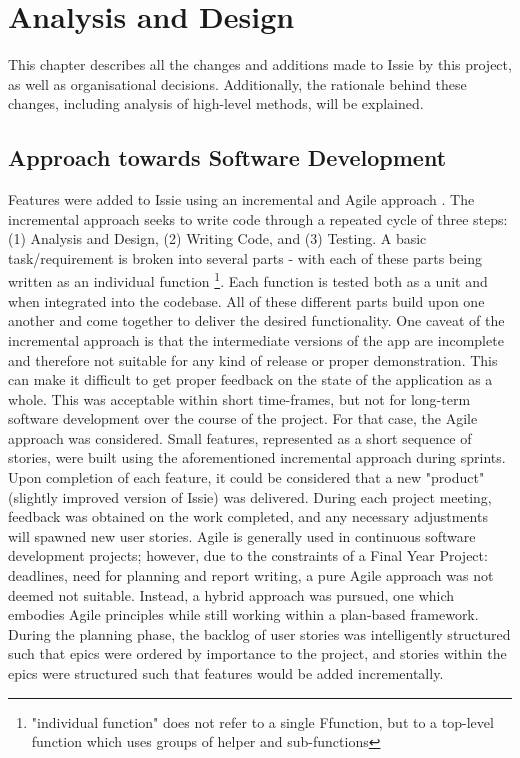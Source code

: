 \chapter{Analysis and Design}
This chapter describes all the changes and additions made to Issie by this project, as well as organisational decisions. Additionally, the rationale behind these changes, including analysis of high-level methods, will be explained. 
\section{Approach towards Software Development}
Features were added to Issie using an incremental and Agile approach \cite{Voorhees2020}.
The incremental approach seeks to write code through a repeated cycle of three steps: (1) Analysis and Design, (2) Writing Code, and (3) Testing. A basic task/requirement is  broken into several parts - with each of these parts being written as an individual function \footnote{"individual function" does not refer to a single F\fsharp function, but to a top-level function which uses groups of helper and sub-functions}. Each function is tested both as a unit and when integrated into the codebase. All of these different parts build upon one another and come together to deliver the desired functionality. One caveat of the incremental approach is that the intermediate versions of the app are incomplete and therefore not suitable for any kind of release or proper demonstration. This can make it difficult to get proper feedback on the state of the application as a whole. This was acceptable within short time-frames, but not for long-term software development over the course of the project. For that case, the Agile approach was considered. Small features, represented as a short sequence of stories, were built using the aforementioned incremental approach during sprints. Upon completion of each feature, it could be considered that a new "product" (slightly improved version of Issie) was delivered. During each project meeting, feedback was obtained on the work completed, and any necessary adjustments will spawned new user stories. Agile is generally used in continuous software development projects; however, due to the constraints of a Final Year Project: deadlines, need for planning and report writing, a pure Agile approach was not deemed not suitable. Instead, a hybrid approach was pursued, one which embodies Agile principles while still working within a plan-based framework. During the planning phase, the backlog of user stories was intelligently structured such that epics were ordered by importance to the project, and stories within the epics were structured such that features would be added incrementally. 


